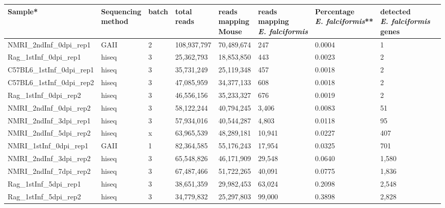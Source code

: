 \documentclass{bmcart}
\begin{document}
\begin{backmatter}
\begin{table}[ht]
\centering
\hspace*{-2.5cm}\begin{tabular}{lllllllll}
  \hline
Sample* & \bcell{Sequencing\\method} & batch & \bcell{total\\reads} & \bcell{reads\\mapping\\Mouse} & \bcell{reads\\mapping\\\textit{E. falciformis}} & \bcell{Percentage\\\textit{E. falciformis}}** & \bcell{detected\\ \textit{E. falciformis}\\genes} \\ 
  \hline
NMRI\_2ndInf\_0dpi\_rep1 & GAII & 2 & 108,937,797 & 70,489,674 & 247 & 0.0004 & 1 \\ 
  Rag\_1stInf\_0dpi\_rep1 & hiseq & 3 & 25,362,793 & 18,853,850 & 443 & 0.0023 & 2 \\ 
  C57BL6\_1stInf\_0dpi\_rep1 & hiseq & 3 & 35,731,249 & 25,119,348 & 457 & 0.0018 & 2 \\ 
  C57BL6\_1stInf\_0dpi\_rep2 & hiseq & 3 & 47,085,959 & 34,377,133 & 608 & 0.0018 & 2 \\ 
  Rag\_1stInf\_0dpi\_rep2 & hiseq & 3 & 46,556,156 & 35,233,327 & 676 & 0.0019 & 2 \\ 
  NMRI\_2ndInf\_0dpi\_rep2 & hiseq & 3 & 58,122,244 & 40,794,245 & 3,406 & 0.0083 & 51 \\ 
  \rowcolor{LightCyan}
  NMRI\_2ndInf\_3dpi\_rep1 & hiseq & 3 & 57,934,016 & 40,544,287 & 4,803 & 0.0118 & 95 \\ 
  \rowcolor{LightCyan}
  NMRI\_2ndInf\_5dpi\_rep2 & hiseq & x & 63,965,539 & 48,289,181 & 10,941 & 0.0227 & 407 \\ 
  \rowcolor{LightRed}
  NMRI\_1stInf\_0dpi\_rep1 & GAII & 1 & 82,364,585 & 55,176,243 & 17,954 & 0.0325 & 701 \\ 
  NMRI\_2ndInf\_3dpi\_rep2 & hiseq & 3 & 65,548,826 & 46,171,909 & 29,548 & 0.0640 & 1,580 \\ 
  NMRI\_2ndInf\_7dpi\_rep2 & hiseq & 3 & 67,487,466 & 51,722,265 & 40,091 & 0.0775 & 1,836 \\ 
  Rag\_1stInf\_5dpi\_rep1 & hiseq & 3 & 38,651,359 & 29,982,453 & 63,024 & 0.2098 & 2,548 \\ 
  Rag\_1stInf\_5dpi\_rep2 & hiseq & 3 & 34,779,832 & 25,297,803 & 99,000 & 0.3898 & 2,828 \\ 

\end{tabular}
\end{table}
\end{backmatter}
\end{document}
